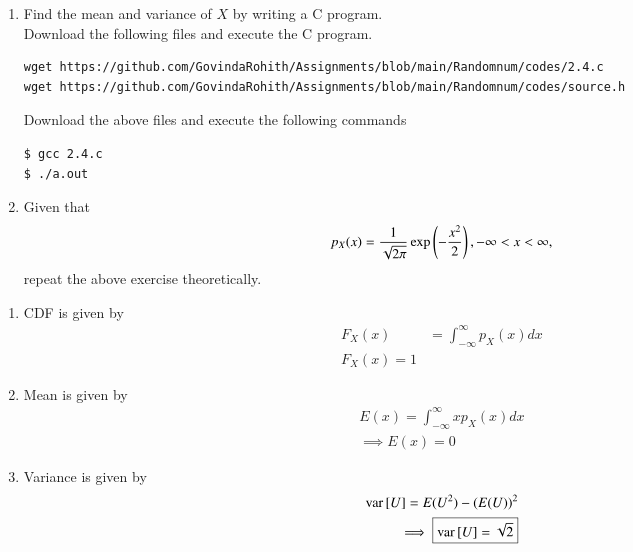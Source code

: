 \documentclass[journal,12pt,twocolumn]{IEEEtran}
\renewcommand\thesection{\arabic{section}}
\begin{document}
\begin{enumerate}[label=\thesection.\arabic*
,ref=\thesection.\theenumi]
\begin{enumerate}
    \item Decreasing function for $x>\mu$ and increasing for $x<\mu$ and attains maximum at $x=\mu$
    \item Area under the curve is unity.
\end{enumerate}
\item Find the mean and variance of $X$ by writing a C program.\\
\solution Download the following files and execute the  C program.
\begin{lstlisting}
wget https://github.com/GovindaRohith/Assignments/blob/main/Randomnum/codes/2.4.c
wget https://github.com/GovindaRohith/Assignments/blob/main/Randomnum/codes/source.h
\end{lstlisting}
Download the above files and execute the following commands
\begin{lstlisting}
$ gcc 2.4.c
$ ./a.out
\end{lstlisting}
\item Given that 
\begin{align}
p_{X}(x) = \frac{1}{\sqrt{2\pi}}\exp\left(-\frac{x^2}{2}\right), -\infty < x < \infty,
\end{align}
repeat the above exercise theoretically.
\end{enumerate}
\solution 
\begin{enumerate}
    \item CDF is given by 
    \begin{align}
        F_X(x)&=\int_{-\infty}^{\infty}p_X(x)dx\\
        \boxed{F_X(x)=1}
    \end{align}
    \item Mean is given by
    \begin{align}
        E(x)=\int_{-\infty}^{\infty}xp_X(x)dx\\
        \implies \boxed{E(x)=0}
    \end{align}
    \item Variance is given by
    \begin{align}
        \text{var}{}\left[U\right]=E(U^2)-(E(U))^2\\
        \implies\boxed{\text{var}{}\left[U\right]=\sqrt{2}}
    \end{align}
\end{enumerate}
\end{document}
